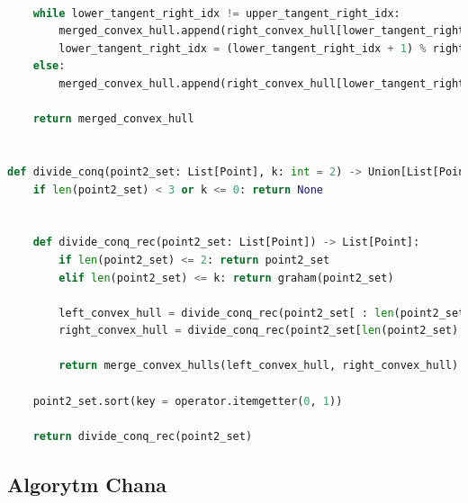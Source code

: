\documentclass[11pt]{article}
\theoremstyle{remark} \newtheorem{definition}{def.}
\theoremstyle{definition} \newtheorem{twierdzenie}{tw.}
\begin{document}
\begin{lstlisting}[language=Python]
        
    while lower_tangent_right_idx != upper_tangent_right_idx:
        merged_convex_hull.append(right_convex_hull[lower_tangent_right_idx])
        lower_tangent_right_idx = (lower_tangent_right_idx + 1) % right_ch_size    
    else:
        merged_convex_hull.append(right_convex_hull[lower_tangent_right_idx])
    
    return merged_convex_hull 


def divide_conq(point2_set: List[Point], k: int = 2) -> Union[List[Point], None]:
    if len(point2_set) < 3 or k <= 0: return None     

    
    def divide_conq_rec(point2_set: List[Point]) -> List[Point]:
        if len(point2_set) <= 2: return point2_set
        elif len(point2_set) <= k: return graham(point2_set)
    
        left_convex_hull = divide_conq_rec(point2_set[ : len(point2_set) // 2])
        right_convex_hull = divide_conq_rec(point2_set[len(point2_set) // 2 : ])
    
        return merge_convex_hulls(left_convex_hull, right_convex_hull)
    
    point2_set.sort(key = operator.itemgetter(0, 1))    

    return divide_conq_rec(point2_set)
\end{lstlisting}

\subsection{Algorytm Chana}
\end{document}
